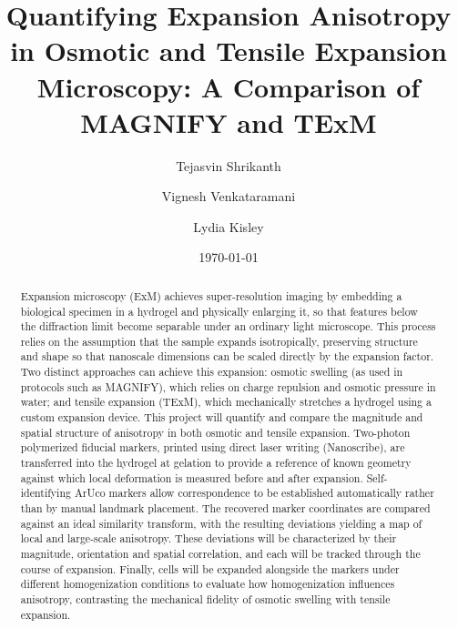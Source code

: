 \documentclass[%
 reprint,
 11pt,
 amsmath,amssymb,
 aps,
]{revtex4-2}
\begin{document}
\title{Quantifying Expansion Anisotropy in Osmotic and Tensile Expansion Microscopy: A Comparison of MAGNIFY and TExM}%

\author{Tejasvin Shrikanth} %

\author{Vignesh Venkataramani} %

\author{Lydia Kisley} %
%

\date{\today}%

\begin{abstract}
Expansion microscopy (ExM\cite{exm}) achieves super-resolution imaging by embedding a biological specimen in a hydrogel and physically enlarging it, so that features below the diffraction limit become separable under an ordinary light microscope. This process relies on the assumption that the sample expands isotropically, preserving structure and shape so that nanoscale dimensions can be scaled directly by the expansion factor. Two distinct approaches can achieve this expansion: osmotic swelling (as used in protocols such as MAGNIFY\cite{magnify}), which relies on charge repulsion and osmotic pressure in water; and tensile expansion (TExM\cite{texm}), which mechanically stretches a hydrogel using a custom expansion device. This project will quantify and compare the magnitude and spatial structure of anisotropy in both osmotic and tensile expansion. Two-photon polymerized fiducial markers, printed using direct laser writing (Nanoscribe), are transferred into the hydrogel at gelation to provide a reference of known geometry against which local deformation is measured before and after expansion. Self-identifying ArUco markers allow correspondence to be established automatically rather than by manual landmark placement. The recovered marker coordinates are compared against an ideal similarity transform, with the resulting deviations yielding a map of local and large-scale anisotropy. These deviations will be characterized by their magnitude, orientation and spatial correlation, and each will be tracked through the course of expansion. Finally, cells will be expanded alongside the markers under different homogenization conditions to evaluate how homogenization influences anisotropy, contrasting the mechanical fidelity of osmotic swelling with tensile expansion.


\end{abstract}
\end{document}
